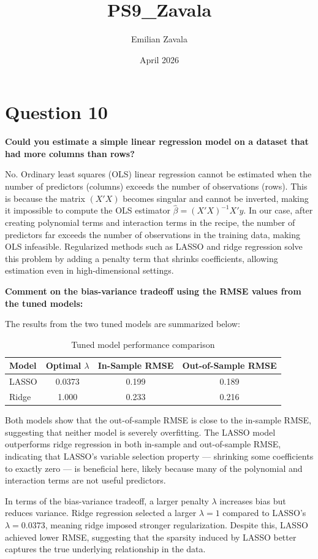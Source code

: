 \documentclass{article}
\title{PS9_Zavala}
\author{Emilian Zavala}
\date{April 2026}
\begin{document}
\section*{Question 10}

\textbf{Could you estimate a simple linear regression model on a dataset that had more columns than rows?}

No. Ordinary least squares (OLS) linear regression cannot be estimated when the number of predictors (columns) exceeds the number of observations (rows). This is because the matrix $(X'X)$ becomes singular and cannot be inverted, making it impossible to compute the OLS estimator $\hat{\beta} = (X'X)^{-1}X'y$. In our case, after creating polynomial terms and interaction terms in the recipe, the number of predictors far exceeds the number of observations in the training data, making OLS infeasible. Regularized methods such as LASSO and ridge regression solve this problem by adding a penalty term that shrinks coefficients, allowing estimation even in high-dimensional settings.

\textbf{Comment on the bias-variance tradeoff using the RMSE values from the tuned models:}

The results from the two tuned models are summarized below:

\begin{table}[h]
\centering
\begin{tabular}{|l|c|c|c|}
\hline
\textbf{Model} & \textbf{Optimal $\lambda$} & \textbf{In-Sample RMSE} & \textbf{Out-of-Sample RMSE} \\
\hline
LASSO & 0.0373 & 0.199 & 0.189 \\
Ridge & 1.000  & 0.233 & 0.216 \\
\hline
\end{tabular}
\caption{Tuned model performance comparison}
\end{table}

Both models show that the out-of-sample RMSE is close to the in-sample RMSE, suggesting that neither model is severely overfitting. The LASSO model outperforms ridge regression in both in-sample and out-of-sample RMSE, indicating that LASSO's variable selection property — shrinking some coefficients to exactly zero — is beneficial here, likely because many of the polynomial and interaction terms are not useful predictors. 

In terms of the bias-variance tradeoff, a larger penalty $\lambda$ increases bias but reduces variance. Ridge regression selected a larger $\lambda = 1$ compared to LASSO's $\lambda = 0.0373$, meaning ridge imposed stronger regularization. Despite this, LASSO achieved lower RMSE, suggesting that the sparsity induced by LASSO better captures the true underlying relationship in the data.
\end{document}
